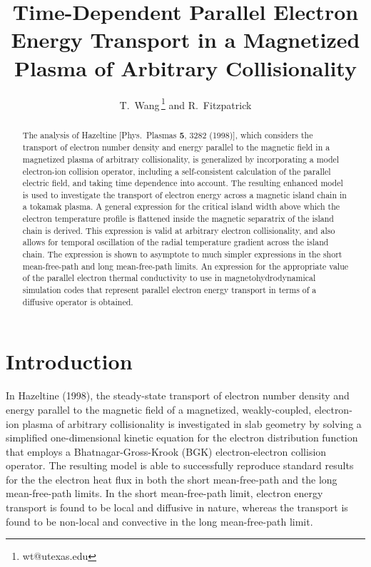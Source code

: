 \documentclass[12pt,prb,aps]{revtex4-1}
\begin{document}
\title{Time-Dependent Parallel Electron Energy Transport in  a Magnetized Plasma of Arbitrary Collisionality}
\author{T.~Wang\,\footnote{wt@utexas.edu} and R.~Fitzpatrick}

\begin{abstract}
The analysis of Hazeltine [Phys.\ Plasmas {\bf 5}, 3282 (1998)], which considers the transport of electron number density and energy parallel to the magnetic
field in a magnetized plasma of arbitrary collisionality,  is generalized by  incorporating a model electron-ion collision operator,
 including a self-consistent calculation of the parallel electric field, and taking time dependence into account. The resulting enhanced model is
 used to investigate the transport of electron energy across a magnetic island chain in a tokamak plasma. A general expression for the critical
 island width above which the electron temperature profile is flattened inside the magnetic separatrix of the island chain is derived.
 This expression is valid at arbitrary electron collisionality, and also allows for temporal oscillation of the radial temperature gradient across the island chain. 
 The expression is shown to asymptote to much  simpler expressions in the short mean-free-path and long mean-free-path limits. An expression for
 the appropriate value of the parallel electron thermal conductivity to use in magnetohydrodynamical simulation codes that represent parallel
 electron energy transport in terms of a diffusive operator is obtained. 
 \end{abstract}
\maketitle

\section{Introduction}
In Hazeltine (1998),\cite{haz}  the steady-state transport of electron number density and energy parallel to the magnetic field
of a magnetized, weakly-coupled, electron-ion plasma of arbitrary collisionality is investigated  in slab geometry   by solving a simplified one-dimensional kinetic equation for the electron distribution function that employs a Bhatnagar-Gross-Krook (BGK)  electron-electron collision
operator.\cite{krook}  The resulting model is able to successfully reproduce standard results for the the electron heat flux in both the short mean-free-path and
the long mean-free-path limits. In the short mean-free-path limit, electron energy transport is found to be local and diffusive in nature, whereas the transport is found to be non-local and convective in the
long mean-free-path limit. 
\end{document}
